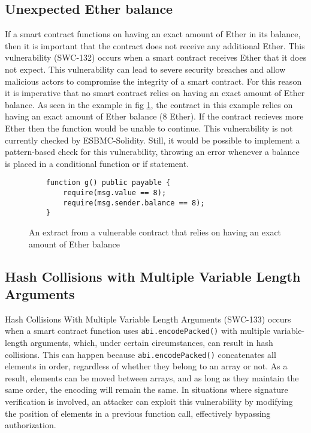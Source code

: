 \subsection{Unexpected Ether balance}
\label{sec:unexpected_ether_balance}

If a smart contract functions on having an exact amount of Ether in its balance, then it is important that the contract does not receive any additional Ether. This vulnerability (SWC-132) occurs when a smart contract receives Ether that it does not expect. This vulnerability can lead to severe security breaches and allow malicious actors to compromise the integrity of a smart contract. For this reason it is imperative that no smart contract relies on having an exact amount of Ether balance. As seen in the example in fig \ref{fig:unexpected_ether_balance}, the contract in this example relies on having an exact amount of Ether balance (8 Ether). If the contract recieves more Ether then the function would be unable to continue. This vulnerability is not currently checked by ESBMC-Solidity. Still, it would be possible to implement a pattern-based check for this vulnerability, throwing an error whenever a balance is placed in a conditional function or if statement.

\begin{figure}
\begin{lstlisting}
    function g() public payable {
        require(msg.value == 8);
        require(msg.sender.balance == 8);
    }
\end{lstlisting}
\caption{An extract from a vulnerable contract that relies on having an exact amount of Ether balance}
\label{fig:unexpected_ether_balance}
\end{figure}

\subsection{Hash Collisions with Multiple Variable Length Arguments}
\label{sec:hash_collisions_with_multiple_variable_length_arguments}

Hash Collisions With Multiple Variable Length Arguments (SWC-133) occurs when a smart contract function uses \verb|abi.encodePacked()| with multiple variable-length arguments, which, under certain circumstances, can result in hash collisions. This can happen because \verb|abi.encodePacked()| concatenates all elements in order, regardless of whether they belong to an array or not. As a result, elements can be moved between arrays, and as long as they maintain the same order, the encoding will remain the same. In situations where signature verification is involved, an attacker can exploit this vulnerability by modifying the position of elements in a previous function call, effectively bypassing authorization.

